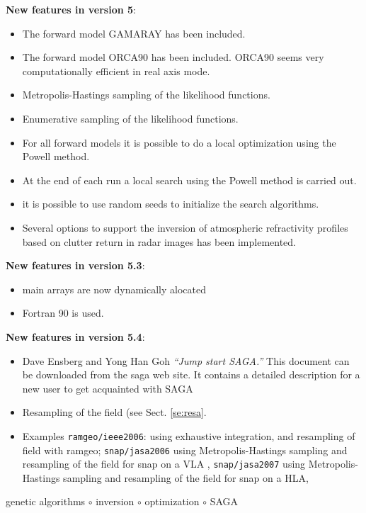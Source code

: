 \documentclass{saclantc}
\begin{document}
\begin{prelims}
{\bf New features in version 5}:
\begin{itemize}
\vspace{-0.2cm}
\item The forward model {\sf GAMARAY} has been included.
\item The forward model {\sf ORCA90} has been included.
{\sf ORCA90} seems very computationally efficient in real axis mode.
\item Metropolis-Hastings sampling of the likelihood functions.
\item Enumerative sampling of the likelihood functions.
\item For all forward models it is possible to do a local optimization
using the Powell method.
\item At the end of each run a local search using the Powell method
is carried out.
\item it is possible to use random seeds to initialize the search algorithms.
\item Several options to support the inversion of atmospheric
  refractivity profiles based on clutter return in radar images has
  been implemented.
\end{itemize}
{\bf New features in version 5.3}:
\begin{itemize}
\vspace{-0.2cm}
\item main arrays are now dynamically alocated
\item Fortran 90 is used.
\end{itemize}
{\bf New features in version 5.4}:
\begin{itemize}
\vspace{-0.2cm}
\item Dave Ensberg and Yong Han Goh {\it  ``Jump start SAGA.''} This document can be downloaded from the saga web site. It contains a detailed description for a new user to get acquainted with SAGA
\item Resampling of the field (see Sect. \ref{se:resa}.
\item Examples  {\tt ramgeo/ieee2006}: using exhaustive integration, and resampling of field with ramgeo; {\tt snap/jasa2006} using Metropolis-Hastings sampling and resampling of the field for {\sc snap} on a VLA , {\tt snap/jasa2007} using Metropolis-Hastings sampling and resampling of the field for {\sc snap} on a HLA,
\end{itemize}

\begin{keywords}
genetic algorithms $\circ$ inversion $\circ$ optimization $\circ$ SAGA
\end{keywords} 

\tableofcontents
\end{prelims}
\end{document}
